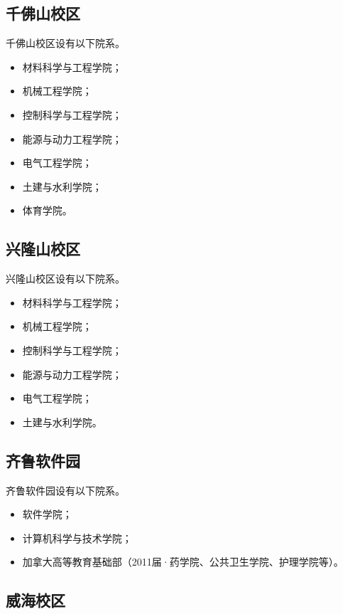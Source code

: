 \documentclass{sduthesis}
\begin{document}
\subsection{千佛山校区}

千佛山校区设有以下院系。

\begin{itemize}
  \item 材料科学与工程学院；
  \item 机械工程学院；
  \item 控制科学与工程学院；
  \item 能源与动力工程学院；
  \item 电气工程学院；
  \item 土建与水利学院；
  \item 体育学院。
\end{itemize}

\subsection{兴隆山校区}

兴隆山校区设有以下院系。

\begin{itemize}
  \item 材料科学与工程学院；
  \item 机械工程学院；
  \item 控制科学与工程学院；
  \item 能源与动力工程学院；
  \item 电气工程学院；
  \item 土建与水利学院。
\end{itemize}

\subsection{齐鲁软件园}

齐鲁软件园设有以下院系。

\begin{itemize}
  \item 软件学院；
  \item 计算机科学与技术学院；
  \item 加拿大高等教育基础部（2011届·药学院、公共卫生学院、护理学院等）。
\end{itemize}

\subsection{威海校区}
\end{document}
